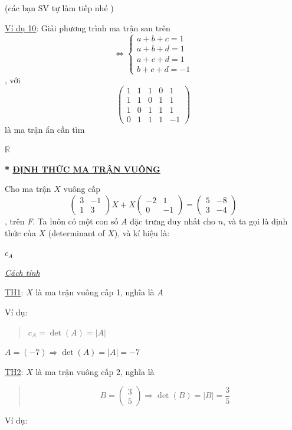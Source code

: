 \documentclass[
]{article}
\let\ul\uline
\begin{document}
(các bạn SV tự làm tiếp nhé )

\ul{Ví dụ 10}: Giải phương trình ma trận sau trên
$$\Leftrightarrow \begin{cases} a+b+c = 1 \\ a+b+d = 1 \\ a+c+d = 1 \\ b+c+d = -1 \end{cases}$$, với
$$\begin{pmatrix} 1 & 1 & 1 & 0 & 1 \\ 1 & 1 & 0 & 1 & 1 \\ 1 & 0 & 1 & 1 & 1 \\ 0 & 1 & 1 & 1 & -1 \end{pmatrix}$$ là ma trận ẩn
cần tìm

$\mathbb{R}$

\textbf{* \ul{ĐỊNH THỨC MA TRẬN VUÔNG}}

Cho ma trận $X$
vuông cấp $$\begin{pmatrix} 3 & -1 \\ 1 & 3 \end{pmatrix} X + X \begin{pmatrix} -2 & 1 \\ 0 & -1 \end{pmatrix} = \begin{pmatrix} 5 & -8 \\ 3 & -4 \end{pmatrix}$$,
trên \emph{F}. Ta luôn có một con số
$A$ đặc trưng duy
nhất cho $n$, và
ta gọi là định thức của
$X$ (determinant
of $X$), và kí
hiệu là:

$c_A$

\emph{\ul{Cách tính}}

\ul{TH1}: $X$ là
ma trận vuông cấp 1, nghĩa là
$A$

Ví dụ:

\begin{quote}
$c_A = \det(A) = |A|$
\end{quote}

$A = (-7) \Rightarrow \det(A) = |A| = -7$

\ul{TH2}: $X$ là
ma trận vuông cấp 2, nghĩa là

\begin{quote}
$$B = \begin{pmatrix} 3 \\ 5 \end{pmatrix} \Rightarrow \det(B) = |B| = \frac{3}{5}$$
\end{quote}

Ví dụ:
\end{document}
